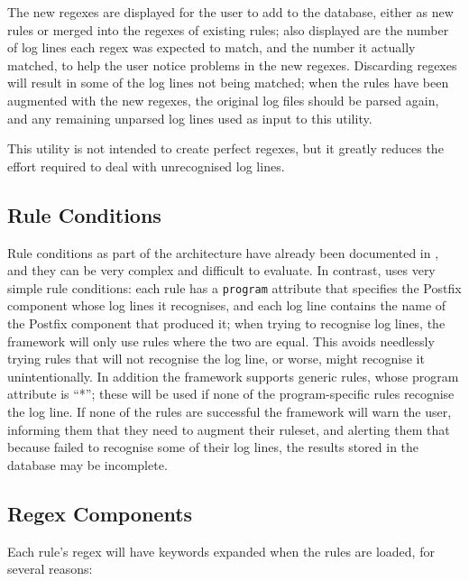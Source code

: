 The new regexes are displayed for the user to add to the database, either
as new rules or merged into the regexes of existing rules; also displayed
are the number of log lines each regex was expected to match, and the
number it actually matched, to help the user notice problems in the new
regexes.  Discarding regexes will result in some of the log lines not being
matched; when the rules have been augmented with the new regexes, the
original log files should be parsed again, and any remaining unparsed log
lines used as input to this utility.

This utility is not intended to create perfect regexes, but it greatly
reduces the effort required to deal with unrecognised log lines.

\subsection{Rule Conditions}

\label{rule conditions in implementation}

Rule conditions as part of the architecture have already been documented in
, and they can be very complex
and difficult to evaluate.  In contrast, \parsername{} uses very simple
rule conditions: each rule has a \texttt{program} attribute that specifies
the Postfix component whose log lines it recognises, and each log line
contains the name of the Postfix component that produced it; when trying to
recognise log lines, the framework will only use rules where the two are
equal.  This avoids needlessly trying rules that will not recognise the log
line, or worse, might recognise it unintentionally.  In addition the
framework supports generic rules, whose program attribute is ``*''; these
will be used if none of the program-specific rules recognise the log line.
If none of the rules are successful the framework will warn the user,
informing them that they need to augment their ruleset, and alerting them
that because \parsername{} failed to recognise some of their log lines, the
results stored in the database may be incomplete.

\subsection{Regex Components}

\label{regex components}

Each rule's regex will have keywords expanded when the rules are loaded,
for several reasons:

